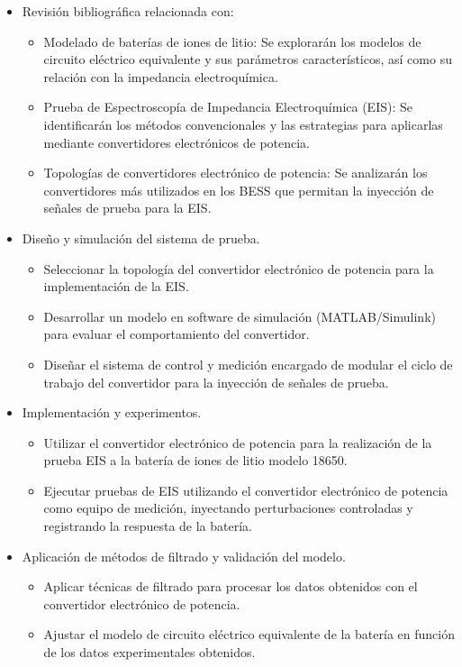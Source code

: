 \begin{itemize}
    \item Revisión bibliográfica relacionada con:
\begin{itemize}
    \item Modelado de baterías de iones de litio: Se explorarán los modelos de circuito eléctrico equivalente y sus parámetros característicos, así como su relación con la impedancia electroquímica.
    \item Prueba de Espectroscopía de Impedancia Electroquímica (EIS): Se identificarán los métodos convencionales y las estrategias para aplicarlas mediante convertidores electrónicos de potencia.
    \item Topologías de convertidores electrónico de potencia: Se analizarán los convertidores más utilizados en los BESS que permitan la inyección de señales de prueba para la EIS.
\end{itemize}

\item Diseño y simulación del sistema de prueba.
\begin{itemize}
    \item Seleccionar la topología del convertidor electrónico de potencia para la implementación de la EIS.
    \item Desarrollar un modelo en software de simulación (MATLAB/Simulink) para evaluar el comportamiento del convertidor.
    \item Diseñar el sistema de control y medición encargado de modular el ciclo de trabajo del convertidor para la inyección de señales de prueba.
\end{itemize}

\item Implementación y experimentos.
\begin{itemize}
    \item Utilizar el convertidor electrónico de potencia para la realización de la prueba EIS a la batería de iones de litio modelo 18650.
    \item Ejecutar pruebas de EIS utilizando el convertidor electrónico de potencia como equipo de medición, inyectando perturbaciones controladas y registrando la respuesta de la batería.
\end{itemize}

\item Aplicación de métodos de filtrado y validación del modelo.
\begin{itemize}
    \item Aplicar técnicas de filtrado para procesar los datos obtenidos con el convertidor electrónico de potencia.
    \item Ajustar el modelo de circuito eléctrico equivalente de la batería en función de los datos experimentales obtenidos.
\end{itemize}


\end{itemize}
